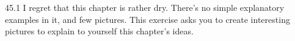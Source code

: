 \documentclass[12pt, a4paper]{article}
\begin{document}
\begin{prob}{45.1}
I regret that this chapter is rather dry. There's no simple explanatory examples in it, and few pictures. This exercise asks you to create interesting pictures to explain to yourself this chapter's ideas.
\end{prob}
\begin{sol}
\end{sol}
\bigskip
\end{document}
